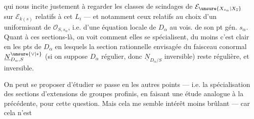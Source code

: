 qui nous incite justement à regarder les classes de scindages de $\mathcal E_{\unsure{X_{s_\alpha}|X_{\overline s}}}$ sur $\mathcal E_{k(s)}$ relatifs à cet $L_i$ --- et notamment ceux relatifs au choix d'un uniformisant de $\mathcal O_{S,s_\alpha}$, i.e. d'une équation locale de $D_\alpha$ au vois. de son pt gén. $s_\alpha$.   Quant à ces sections-là, on voit comment elles se spécialisent, du moins c'est clair en les pts de $D_\alpha$ en lesquels la section rationnelle envisagée du faisceau conormal $\underline N_{D_\alpha,S}^{\unsure{\vee|*}}$ (si on suppose $D_\alpha$ régulier,  donc $\underline N_{D_\alpha/S}$ inversible) reste régulière, et inversible.

On peut se proposer d'étudier   se passe en les autres points --- i.e. la spécialisation des sections  d'extensions de groupes profinis, en faisant une étude analogue à la précédente, pour cette question. Mais cela me semble   intérêt moins brûlant --- car cela n'est
